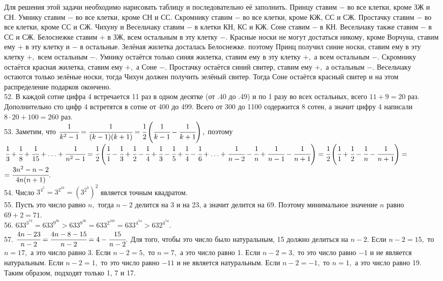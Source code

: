 Для решения этой задачи необходимо нарисовать таблицу и последовательно её заполнить. Принцу ставим $-$ во все клетки, кроме ЗЖ и СН. Умнику ставим $-$ во все клетки, кроме СН и СС. Скромнику ставим $-$ во все клетки, кроме КЖ, СС и СЖ. Простачку ставим $-$ во все клетки, кроме СС и СЖ. Чихуну и Весельчаку ставим $-$ в клетки КН, КС и КЖ. Соне ставим $-$ в КН. Весельчаку также ставим $-$ в СС и СЖ. Белоснежке ставим $+$ в ЗЖ, всем остальным в эту клетку $-$. Красные носки не могут достаться никому, кроме Ворчуна, ставим ему $+$ в эту клетку и $-$ в остальные. Зелёная жилетка досталась Белоснежке. поэтому Принц получил синие носки, ставим ему в эту клетку $+,$ всем остальным $-.$ Умнику остаётся только синяя жилетка, ставим ему в эту клетку $+,$ а всем остальным $-.$ Скромнику остаётся красная жилетка, ставим ему $+,$ а Соне $-.$ Простачку остаётся синий свитер, ставим ему $+,$ а остальным $-.$ Весельчаку остаются только зелёные носки, тогда Чихун должен получить зелёный свитер. Тогда Соне остаётся красный свитер и на этом распределение подарков окончено.\\
52. В каждой сотне цифра 4 встречается 11 раз в одном десятке (от .40 до .49) и по 1 разу во всех остальных, всего $11+9=20$ раз. Дополнительно сто цифр 4 встретятся в сотне от 400 до 499. Всего от 300 до 1100 содержится 8 сотен, а значит цифру 4 написали $8\cdot20+100=260$ раз.\\
53. Заметим, что $\cfrac{1}{k^2-1}=\cfrac{1}{(k-1)(k+1)}=\cfrac{1}{2}\left(\cfrac{1}{k-1}-\cfrac{1}{k+1}\right),$ поэтому
$\cfrac{1}{3}+\cfrac{1}{8}+\cfrac{1}{15}+\ldots+\cfrac{1}{n^2-1}=\cfrac{1}{2}\left(\cfrac{1}{1}-\cfrac{1}{3}+\cfrac{1}{2}-\cfrac{1}{4}+
\cfrac{1}{3}-\cfrac{1}{5}+\cfrac{1}{4}-\cfrac{1}{6}+\ldots+\cfrac{1}{n-2}-\cfrac{1}{n}+\cfrac{1}{n-1}-\cfrac{1}{n+1}\right)=
\cfrac{1}{2}\left(\cfrac{1}{1}+\cfrac{1}{2}-\cfrac{1}{n}-\cfrac{1}{n+1}\right)=$\\$=\cfrac{3n^2-n-2}{4n(n+1)}.$\\
54. Число $3^{4^5}=3^{2^{10}}=\left(3^{2^9}\right)^2$ является точным квадратом.\\
55. Пусть это число равно $n,$ тогда $n-2$ делится на 3 и на 23, а значит делится на 69. Поэтому минимальное значение $n$ равно $69+2=71.$\\
56. $633^{3^{72}}=633^{9^{36}}>633^{8^{36}}=633^{2^{108}}=633^{4^{54}}>632^{4^{54}}.$\\
57. $\cfrac{4n-23}{n-2}=\cfrac{4n-8-15}{n-2}=4-\cfrac{15}{n-2}.$ Для того, чтобы это число было натуральным, 15 должно делиться на $n-2.$ Если $n-2=15,$ то $n=17,$ а это число равно 3. Если $n-2=5,$ то $n=7,$ а это число равно 1. Если $n-2=3,$ то это число равно $-1$ и не является натуральным. Если $n-2=1,$ то это число равно $-11$ и не является натуральным. Если $n-2=-1,$ то $n=1,$ а это число равно 19. Таким образом, подходят только 1, 7 и 17.\\
